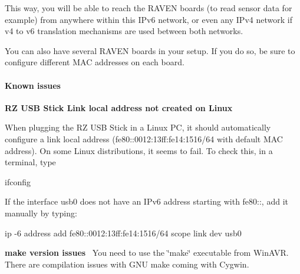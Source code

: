 This way, you will be able to reach the R\+A\+V\+EN boards (to read sensor data for example) from anywhere within this I\+Pv6 network, or even any I\+Pv4 network if v4 to v6 translation mechanisms are used between both networks.

You can also have several R\+A\+V\+EN boards in your setup. If you do so, be sure to configure different M\+AC addresses on each board.



 \hypertarget{a00072_issues}{}\paragraph{Known issues}\label{a00072_issues}
{\bfseries RZ U\+SB Stick Link local address not created on Linux}~\newline


When plugging the RZ U\+SB Stick in a Linux PC, it should automatically configure a link local address (fe80\+:\+:0012\+:13ff\+:fe14\+:1516/64 with default M\+AC address). On some Linux distributions, it seems to fail. To check this, in a terminal, type \begin{DoxyVerb}ifconfig
\end{DoxyVerb}
 If the interface usb0 does not have an I\+Pv6 address starting with fe80\+:\+:, add it manually by typing\+: \begin{DoxyVerb}ip -6 address add fe80::0012:13ff:fe14:1516/64 scope link dev usb0
\end{DoxyVerb}


{\bfseries make version issues}~\newline
 You need to use the \char`\"{}make\char`\"{} executable from Win\+A\+VR. There are compilation issues with G\+NU make coming with Cygwin.



